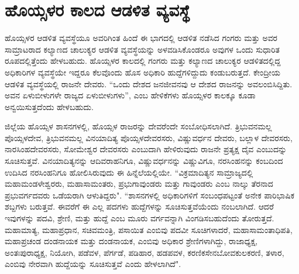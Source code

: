 \section*{ಹೊಯ್ಸಳರ ಕಾಲದ ಆಡಳಿತ ವ್ಯವಸ್ಥೆ}

ಹೊಯ್ಸಳರ ಆಡಳಿತ ವ್ಯವಸ್ಥೆಯೂ ಅವರಿಗಿಂತ ಹಿಂದೆ ಈ ಭಾಗದಲ್ಲಿ ಆಡಳಿತ ನಡೆಸಿದ ಗಂಗರು ಮತ್ತು ಅವರ ಸಾಮ್ರಾಟರಾದ ಕಲ್ಯಾಣದ ಚಾಲುಕ್ಯರ ಆಡಳಿತ ವ್ಯವಸ್ಥೆಯನ್ನು ಅಳವಡಿಸಿಕೊಂಡರೂ ಅವುಗಳ ಒಂದು ಸುಧಾರಿತ ರೂಪದಲ್ಲಿತ್ತೆಂದು ಹೇಳಬಹುದು. ಹೊಯ್ಸಳರ ಕಾಲದಲ್ಲಿ ಗಂಗರು ಮತ್ತು ಕಲ್ಯಾಣದ ಚಾಲುಕ್ಯರ ಆಡಳಿತದಲ್ಲಿದ್ದ ಅಧಿಕಾರಿಗಳ ವ್ಯವಸ್ಥೆಯೇ ಇದ್ದರೂ ಕೆಲವೊಂದು ಹೊಸ ಅಧಿಕಾರಿ ಹುದ್ದೆಗಳಿದ್ದುದು ಕಂಡುಬರುತ್ತದೆ. ಕೇಂದ್ರೀಯ ಆಡಳಿತ ವ್ಯವಸ್ಥೆಯಲ್ಲಿ ರಾಜನೇ ದೇವರು. “ಒಂದು ದೇಶದ ಜನಜೀವನವು ಆ ದೇಶದ ರಾಜನನ್ನು ಅವಲಂಬಿಸಿದ್ದಿತು. ಅವನ ಏಳುಬೀಳುಗಳೇ ರಾಜ್ಯದ ಏಳುಬೀಳುಗಳು”, ಎಂಬ ಹೇಳಿಕೆಗಳು ಹೊಯ್ಸಳರ ಕಾಲಕ್ಕೂ ಕೂಡಾ ಅನ್ವಯಿಸುತ್ತದೆಂದು ಹೇಳಬಹುದು.

ಜಿಲ್ಲೆಯ ಹೊಯ್ಸಳ ಶಾಸನಗಳಲ್ಲಿ, ಹೊಯ್ಸಳ ರಾಜರನ್ನು ದೇವರೆಂದೇ ಸಂಬೋಧಿಸಲಾಗಿದೆ. ತ್ರಿಭುವನಮಲ್ಲ ಪೊಯ್ಸಳದೇವ, ತ್ರಿಭುವನಮಲ್ಲ ವಿನಯಾದಿತ್ಯ ಪೊಯ್ಸಳದೇವರಸರು, ವಿಷ್ಣುವರ್ಧನ ದೇವರು, ಬಲ್ಲಾಳ ದೇವರಸರು, ನಾರಸಿಂಹದೇವರಸರು, ಸೋಮೇಶ್ವರ ದೇವರಸರು ಎಂಬುದಾಗಿ ಹೇಳಿರುವುದು ರಾಜನೇ ಪ್ರತ್ಯಕ್ಷ ದೈವ ಎಂಬುದನ್ನು ಸೂಚಿಸುತ್ತವೆ. ವಿನಯಾದಿತ್ಯನನ್ನು ಆದಿವರಾಹನಿಗೂ, ವಿಷ್ಣುವರ್ಧನನ್ನು ವಿಷ್ಣುವಿಗೂ, ನರಸಿಂಹನನ್ನು ಕಂಬದಿಂದ ಉದಿಸಿದ ನರಸಿಂಹನಿಗೂ ಹೋಲಿಸಿರುವುದು ಈ ಹಿನ್ನೆಲೆಯಲ್ಲಿಯೇ. “ವಿಕ್ರಮಾದಿತ್ಯನ ಸಾಮ್ರಾಜ್ಯದಲ್ಲಿ ಮಹಾಮಂಡಳೇಶ್ವರರು, ಮಹಾಸಾಮಂತರು, ಪ್ರಭುಗಾವುಂಡರು ಮತ್ತು ಗಾವುಂಡರು ಎಂಬ ನಾಲ್ಕು ತೆರನಾದ ಪ್ರಭುವರ್ಗದವರು ಒಡೆಯರಾಗಿ ಆಳುತಿದ್ದರು". “ಶಾಸನಗಳಲ್ಲಿ ಅಧಿಕಾರಿಗಳಿಗೆ ಸಂಬಂಧಪಟ್ಟಂತೆ ಅನೇಕ ಪಾರಿಭಾಷಿಕ ಶಬ್ದಗಳು ಬರುತ್ತವೆ. ಈವರೆಗೆ ಈ ಎಲ್ಲ ಪದಗಳು ಹುದ್ದೆಗಳನ್ನು ಸೂಚಿಸುತ್ತವೆಯೆಂದು ನಂಬಲಾಗಿದೆ. ಆದರೆ ಇವುಗಳನ್ನು ಪದವಿ, ಶ್ರೇಣಿ, ಮತ್ತು ಹುದ್ದೆ ಎಂಬ ಮೂರು ವರ್ಗವನ್ನಾಗಿ ವಿಂಗಡಿಸಬಹುದೆಂದು ತೋರುತ್ತದೆ. ಮಹಾಮಾತ್ಯ, ಮಹಾಪ್ರಧಾನ, ಸಚಿವ\enginline{-}ಮಂತ್ರಿ, ಪಸಾಯಿತ ಎಂಬಿವು ಪದವೀ ಸೂಚಿಗಳಾದರೆ, ಮಹಾಸಾಮಂತಾಧಿಪತಿ, ಮಹಾಪ್ರಚಂಡ ದಂಡನಾಯಕ ಮತ್ತು ದಂಡನಾಯಕ, ಎಂಬಿವು ಅಧಿಕಾರ ಶ್ರೇಣಿಗಳಾಗಿದ್ದು, ರಾಜಾಧ್ಯಕ್ಷ, ಅಂತಃಪುರಾಧ್ಯಕ್ಷ, ನಿಯೋಗಿ, ಪಡೆವಳ, ಪೆರ್ಗಡೆ, ಪಡಿಹಾರ, ಹಡಪವಳ, ಕರಣಿಕ\enginline{-}ಸೇನಬೋವ\enginline{-}ಕುಲಕರಣಿ, ತಳಾರ, ಎಂಬಿವು ನೇರವಾಗಿ ಹುದ್ದೆಯನ್ನು ಸೂಚಿಸುತ್ತವೆ ಎಂದು ಹೇಳಲಾಗಿದೆ".

